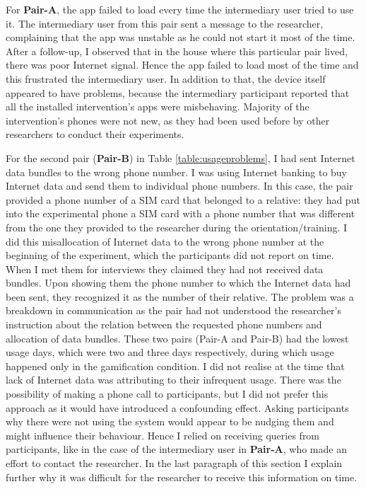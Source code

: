 For \textbf{Pair-A}, the app failed to load every time the intermediary user tried to use it. The intermediary user from this pair sent a message to the researcher, complaining that the app was unstable as he could not start it most of the time. After a follow-up, I observed that in the house where this particular pair lived, there was poor Internet signal. Hence the app failed to load most of the time and this frustrated the intermediary user. In addition to that, the device itself appeared to have problems, because the intermediary participant reported that all the installed intervention's apps were misbehaving. Majority of the intervention's phones were not new, as they had been used before by other researchers to conduct their experiments. 

For the second pair (\textbf{Pair-B}) in Table \ref{table:usageproblems}, I had sent Internet data bundles to the wrong phone number. I was using Internet banking to buy Internet data and send them to individual phone numbers. In this case, the pair provided a phone number of a SIM card that belonged to a relative: they had put into the experimental phone a SIM card with a phone number that was different from the one they provided to the researcher during the orientation/training. I did this misallocation of Internet data to the wrong phone number at the beginning of the experiment, which the participants did not report on time. When I met them for interviews they claimed they had not received data bundles. Upon showing them the phone number to which the Internet data had been sent, they recognized it as the number of their relative. The problem was a breakdown in communication as the pair had not understood the researcher's instruction about the relation between the requested phone numbers and allocation of data bundles. These two pairs (Pair-A and Pair-B) had the lowest usage days, which were two and three days respectively, during which usage happened only in the gamification condition. I did not realise at the time that lack of Internet data was attributing to their infrequent usage. There was the possibility of making a phone call to participants, but I did not prefer this approach as it would have introduced a confounding effect. Asking participants why there were not using the system would appear to be nudging them and might influence their behaviour. Hence I relied on receiving queries from participants, like in the case of the intermediary user in \textbf{Pair-A}, who made an effort to contact the researcher. In the last paragraph of this section I explain further why it was difficult for the researcher to receive this information on time.
 
